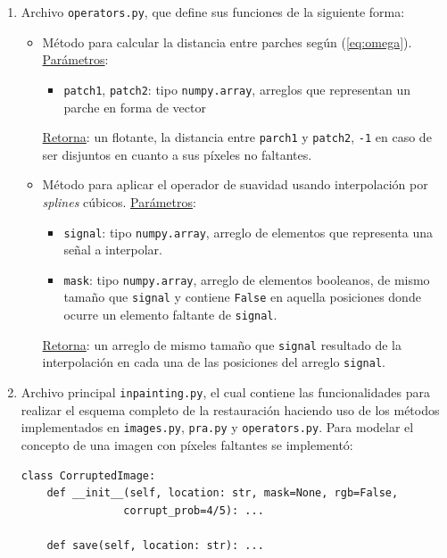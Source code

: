 \begin{enumerate}
	\item Archivo \texttt{operators.py}, que define sus funciones de la siguiente forma:
	\begin{itemize}
		\item {}
		
		M\'etodo para calcular la distancia entre parches seg\'un (\ref{eq:omega}). \underline{Par\'ametros}:
		\begin{itemize}
			\item \texttt{patch1}, \texttt{patch2}: tipo \texttt{numpy.array}, arreglos que representan un parche en forma de vector
		\end{itemize}
		\underline{Retorna}: un flotante, la distancia entre \texttt{parch1} y \texttt{patch2}, \texttt{-1} en caso de ser disjuntos en cuanto a sus p\'ixeles no faltantes.
		
		\item {}
		
		M\'etodo para aplicar el operador de suavidad usando interpolaci\'on por \textit{splines} c\'ubicos. \underline{Par\'ametros}:
		\begin{itemize}
			\item \texttt{signal}: tipo \texttt{numpy.array}, arreglo de elementos que representa una señal a interpolar.
			\item \texttt{mask}: tipo \texttt{numpy.array}, arreglo de elementos booleanos, de mismo tamaño que \texttt{signal} y contiene \texttt{False} en aquella posiciones donde ocurre un elemento faltante de \texttt{signal}.
		\end{itemize}
		\underline{Retorna}: un arreglo de mismo tamaño que \texttt{signal} resultado de la interpolaci\'on en cada una de las posiciones del arreglo \texttt{signal}.
	\end{itemize}
	
	\item Archivo principal \texttt{inpainting.py}, el cual contiene las funcionalidades para realizar el esquema completo de la restauraci\'on haciendo uso de los m\'etodos implementados en \texttt{images.py},  \texttt{pra.py} y \texttt{operators.py}.
	Para modelar el concepto de una imagen con p\'ixeles faltantes se implement\'o:
	\begin{lstlisting}
class CorruptedImage:
	def __init__(self, location: str, mask=None, rgb=False, 
				corrupt_prob=4/5): ...
	
	def save(self, location: str): ...
	

\end{lstlisting}
\end{enumerate}
